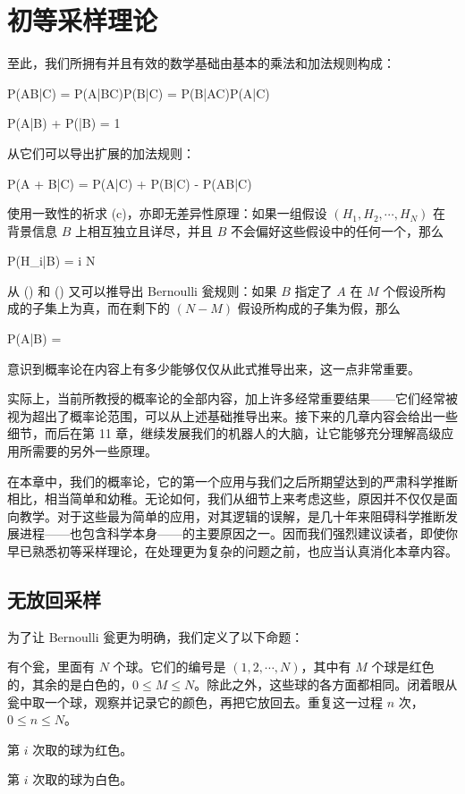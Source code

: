 \chapter[quantitative-rules]{初等采样理论}

至此，我们所拥有并且有效的数学基础由基本的乘法和加法规则构成：

\placeformula[3-1]
\startformula
P(AB|C) = P(A|BC)P(B|C) = P(B|AC)P(A|C)
\stopformula

\placeformula[3-2]
\startformula
P(A|B) + P(|B) = 1
\stopformula

从它们可以导出扩展的加法规则：

\placeformula[3-3]
\startformula
P(A + B|C) = P(A|C) + P(B|C) - P(AB|C)
\stopformula

使用一致性的祈求 (c)，亦即无差异性原理：如果一组假设 $(H_1,H_2,\cdots,H_N)$ 在背景信息 $B$ 上相互独立且详尽，并且 $B$ 不会偏好这些假设中的任何一个，那么

\placeformula[3-4]
\startformula
P(H_i|B) = \quad{}\le i \le N
\stopformula

从 (\in[3-3]) 和 (\in[3-4]) 又可以推导出 Bernoulli 瓮规则：如果 $B$ 指定了 $A$ 在 $M$ 个假设所构成的子集上为真，而在剩下的 $(N - M)$ 假设所构成的子集为假，那么

\placeformula[3-5]
\startformula
P(A|B) = 
\stopformula

意识到概率论在内容上有多少能够仅仅从此式推导出来，这一点非常重要。

实际上，当前所教授的概率论的全部内容，加上许多经常重要结果——它们经常被视为超出了概率论范围，可以从上述基础推导出来。接下来的几章内容会给出一些细节，而后在第 11 章，继续发展我们的机器人的大脑，让它能够充分理解高级应用所需要的另外一些原理。

在本章中，我们的概率论，它的第一个应用与我们之后所期望达到的严肃科学推断相比，相当简单和幼稚。无论如何，我们从细节上来考虑这些，原因并不仅仅是面向教学。对于这些最为简单的应用，对其逻辑的误解，是几十年来阻碍科学推断发展进程——也包含科学本身——的主要原因之一。因而我们强烈建议读者，即使你早已熟悉初等采样理论，在处理更为复杂的问题之前，也应当认真消化本章内容。

\section[sec-3-1]{无放回采样}

为了让 Bernoulli 瓮更为明确，我们定义了以下命题：

 有个瓮，里面有 $N$ 个球。它们的编号是 $(1,2,\cdots,N)$，其中有 $M$ 个球是红色的，其余的是白色的，$0\le M \le N$。除此之外，这些球的各方面都相同。闭着眼从瓮中取一个球，观察并记录它的颜色，再把它放回去。重复这一过程 $n$ 次，$0\le n \le N$。\par
{} 第 $i$ 次取的球为红色。\par
{} 第 $i$ 次取的球为白色。\par

